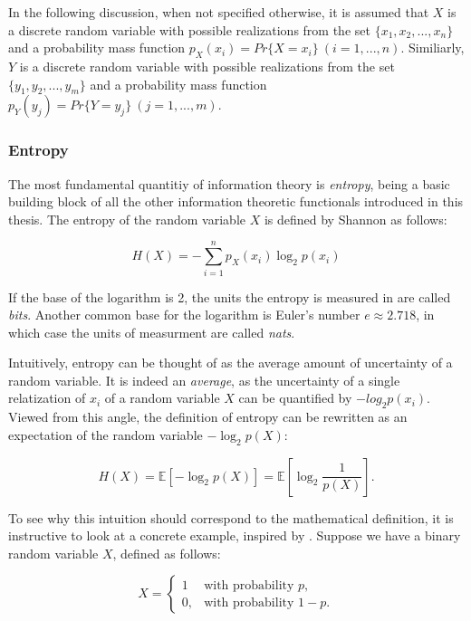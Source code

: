 \documentclass[12pt]{article}
\begin{document}
In the following discussion, when not specified otherwise, it is assumed that $X$ is a discrete random variable with possible realizations from the set $\{x_1, x_2, ..., x_n\}$ and a probability mass function $p_X(x_i) = Pr\{X = x_i\} \ (i = 1, ..., n)$. Similiarly, $Y$ is a discrete random variable with possible realizations from the set $\{y_1, y_2, ..., y_m\}$ and a probability mass function $p_Y(y_j) = Pr\{Y = y_j\} \ (j = 1, ..., m)$.

\subsubsection{Entropy}

The most fundamental quantitiy of information theory is \textit{entropy}, being a basic building block of all the other information theoretic functionals introduced in this thesis. The entropy of the random variable $X$ is defined by Shannon \cite{shannon} as follows: 

\begin{equation}
H(X) = -\sum_{i=1}^{n} p_X(x_i) \log_2 p(x_i)
\label{eq:entropy}
\end{equation}

If the base of the logarithm is 2, the units the entropy is measured in are called \textit{bits}. Another common base for the logarithm is Euler's number $e \approx 2.718$, in which case the units of measurment are called \textit{nats}.

Intuitively, entropy can be thought of as the average amount of uncertainty of a random variable. It is indeed an \textit{average}, as the uncertainty of a single relatization of $x_i$ of a random variable $X$ can be quantified by $-log_2 p(x_i)$. Viewed from this angle, the definition of entropy can be rewritten as an expectation of the random variable $-\log_2 p(X)$: 

$$H(X) = \mathbb{E} \left[ - \log_2 p(X) \right] = \mathbb{E} \left[ \log_2 \frac{1}{p(X)} \right].$$

To see why this intuition should correspond to the mathematical definition, it is instructive to look at a concrete example, inspired by \cite{cover-thomas}. Suppose we have a binary random variable $X$, defined as follows: 

$$X = \begin{cases} 1 & \mbox{with probability } p, \\ 0, & \mbox{with probability } 1-p. \end{cases}$$
\end{document}
